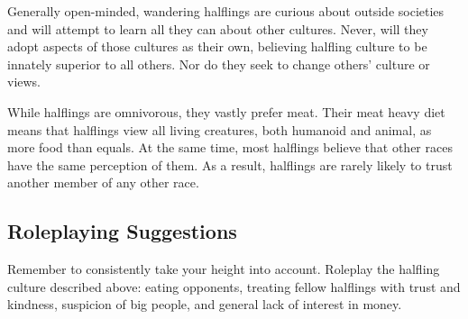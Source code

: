 Generally open-minded, wandering halflings are curious about outside societies and will attempt to learn all they can about other cultures. Never, will they adopt aspects of those cultures as their own, believing halfling culture to be innately superior to all others. Nor do they seek to change others' culture or views.

While halflings are omnivorous, they vastly prefer meat. Their meat heavy diet means that halflings view all living creatures, both humanoid and animal, as more food than equals. At the same time, most halflings believe that other races have the same perception of them. As a result, halflings are rarely likely to trust another member of any other race.

\subsection{Roleplaying Suggestions}
Remember to consistently take your height into account. Roleplay the halfling culture described above: eating opponents, treating fellow halflings with trust and kindness, suspicion of big people, and general lack of interest in money.

